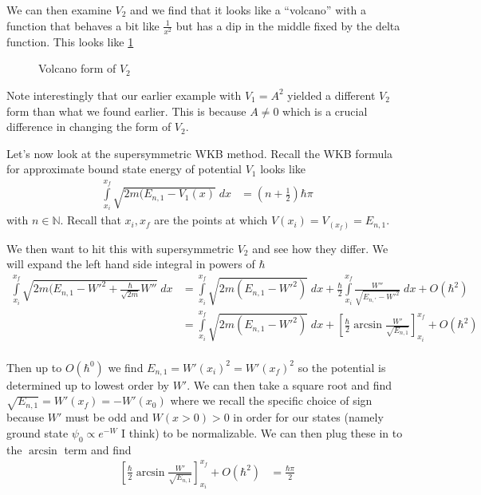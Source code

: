 \documentclass[10pt]{report}
\begin{document}
We can then examine $V_2$ and we find that it looks like a ``volcano'' with a function that behaves a bit like $\frac{1}{x^2}$ but has a dip in the middle fixed by the delta function. This looks like \ref{4.28.volcano}
\begin{figure}[!h]
    \centering
    \caption{Volcano form of $V_2$}
    \label{4.28.volcano}
\end{figure}

Note interestingly that our earlier example with $V_1 = A^2$ yielded a different $V_2$ form than what we found earlier. This is because $A \neq 0$ which is a crucial difference in changing the form of $V_2$.

Let's now look at the supersymmetric WKB method. Recall the WKB formula for approximate bound state energy of potential $V_1$ looks like
\begin{align}
    \int\limits_{x_i}^{x_f} \sqrt{2m(E_{n,1} - V_1(x)}\;dx &= \left( n+\frac{1}{2} \right)\hbar \pi
\end{align}
with $n\in\mathbb{N}$. Recall that $x_i, x_f$ are the points at which $V(x_i) = V_(x_f) = E_{n,1}$. 

We then want to hit this with supersymmetric $V_2$ and see how they differ. We will expand the left hand side integral in powers of $\hbar$
\begin{align}
    \int\limits_{x_i}^{x_f}\sqrt{2m(E_{n,1} - W'^2 + \frac{\hbar}{\sqrt{2m}}W''}\;dx &= \int\limits_{x_i}^{x_f}\sqrt{2m(E_{n,1} - W'^2)}\;dx + \frac{\hbar}{2}\int\limits_{x_i}^{x_f}\frac{W''}{\sqrt{E_{n,'} - W'^2}}\;dx + O(\hbar^2)\\
    &= \int\limits_{x_i}^{x_f}\sqrt{2m(E_{n,1} - W'^2)}\;dx + \left[ \frac{\hbar}{2}\arcsin \frac{W'}{\sqrt{E_{n,1}}} \right]_{x_i}^{x_f} + O(\hbar^2)\\
\end{align}

Then up to $O(\hbar^0)$ we find $E_{n,1} = W'(x_i)^2 = W'(x_f)^2$ so the potential is determined up to lowest order by $W'$. We can then take a square root and find $\sqrt{E_{n,1} } = W'(x_f) = -W'(x_0)$ where we recall the specific choice of sign because $W'$ must be odd and $W(x > 0) > 0$ in order for our states (namely ground state $\psi_0 \propto e^{-W}$ I think) to be normalizable. We can then plug these in to the $\arcsin$ term and find
\begin{align}
    \left[ \frac{\hbar}{2}\arcsin \frac{W'}{\sqrt{E_{n,1}}} \right]_{x_i}^{x_f} + O(\hbar^2) &= \frac{\hbar \pi}{2}
\end{align}
\end{document}
